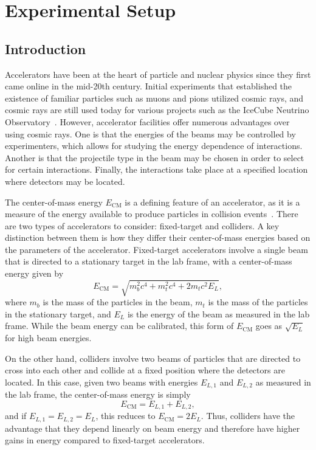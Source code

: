 
\chapter{Experimental Setup}
\label{chap:exp}

\section{Introduction}

Accelerators have been at the heart of particle and nuclear physics since they first came online in the mid-20th century.
Initial experiments that established the existence of familiar particles such as muons and pions utilized cosmic rays, and cosmic rays are still used today for various projects such as the IceCube Neutrino Observatory~\cite{Abbasi_2009}.
However, accelerator facilities offer numerous advantages over using cosmic rays.
One is that the energies of the beams may be controlled by experimenters, which allows for studying the energy dependence of interactions.
Another is that the projectile type in the beam may be chosen in order to select for certain interactions.
Finally, the interactions take place at a specified location where detectors may be located.

The center-of-mass energy $E_\mathrm{CM}$ is a defining feature of an accelerator, as it is a measure of the energy available to produce particles in collision events~\cite{martin2008particle}.
There are two types of accelerators to consider: fixed-target and colliders. %
A key distinction between them is how they differ their center-of-mass energies based on the parameters of the accelerator.
Fixed-target accelerators involve a single beam that is directed to a stationary target in the lab frame, with a center-of-mass energy given by
\begin{equation}
  E_\mathrm{CM}=\sqrt{m_b^2c^4+m_t^2c^4+2m_tc^2E_L},
\end{equation}
where $m_b$ is the mass of the particles in the beam, $m_t$ is the mass of the particles in the stationary target, and $E_L$ is the energy of the beam as measured in the lab frame.
While the beam energy can be calibrated, this form of $E_\mathrm{CM}$ goes as $\sqrt{E_L}$ for high beam energies.

On the other hand, colliders involve two beams of particles that are directed to cross into each other and collide at a fixed position where the detectors are located.
In this case, given two beams with energies $E_{L,1}$ and $E_{L,2}$ as measured in the lab frame, the center-of-mass energy is simply
\begin{equation}
  E_\mathrm{CM}=E_{L,1}+E_{L,2},
\end{equation}
and if $E_{L,1}=E_{L,2}=E_L$, this reduces to $E_\mathrm{CM}=2E_L$.
Thus, colliders have the advantage that they depend linearly on beam energy and therefore have higher gains in energy compared to fixed-target accelerators.


